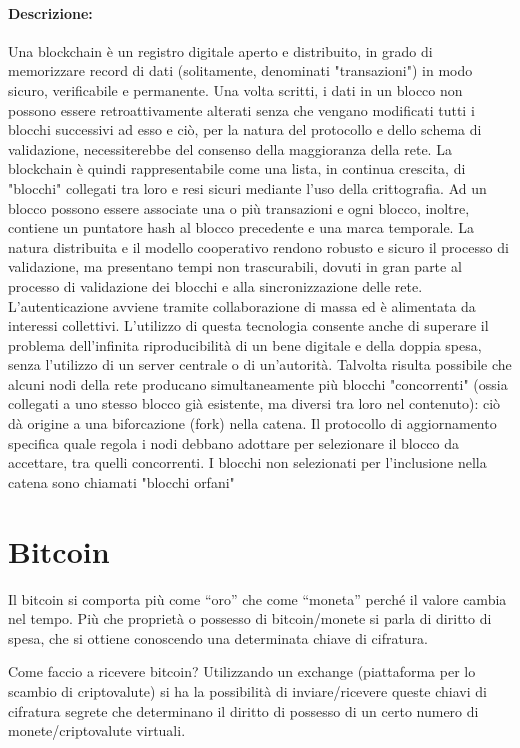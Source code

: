 \paragraph{Descrizione:} Una blockchain è un registro digitale aperto e distribuito, in grado di memorizzare record di dati (solitamente, denominati "transazioni") in modo sicuro, verificabile e permanente. Una volta scritti, i dati in un blocco non possono essere retroattivamente alterati senza che vengano modificati tutti i blocchi successivi ad esso e ciò, per
la natura del protocollo e dello schema di validazione, necessiterebbe del consenso della maggioranza della
rete. La blockchain è quindi rappresentabile come una lista, in continua crescita, di "blocchi" collegati tra loro e
resi sicuri mediante l'uso della crittografia. Ad un blocco possono essere associate una o più transazioni e ogni
blocco, inoltre, contiene un puntatore hash al blocco precedente e una marca temporale.
La natura distribuita e il modello cooperativo rendono robusto e sicuro il processo di validazione, ma presentano
tempi non trascurabili, dovuti in gran parte al processo di validazione dei blocchi e alla sincronizzazione delle
rete. L'autenticazione avviene tramite collaborazione di massa ed è alimentata da interessi collettivi. L'utilizzo di
questa tecnologia consente anche di superare il problema dell'infinita riproducibilità di un bene digitale e
della doppia spesa, senza l'utilizzo di un server centrale o di un'autorità.
Talvolta risulta possibile che alcuni nodi della rete producano simultaneamente più blocchi "concorrenti" (ossia
collegati a uno stesso blocco già esistente, ma diversi tra loro nel contenuto): ciò dà origine a una biforcazione
(fork) nella catena. Il protocollo di aggiornamento specifica quale regola i nodi debbano adottare per selezionare
il blocco da accettare, tra quelli concorrenti. I blocchi non selezionati per l'inclusione nella catena sono chiamati
"blocchi orfani"

\section{Bitcoin}
Il bitcoin si comporta più come “oro” che come “moneta” perché il valore cambia nel tempo. Più che proprietà o
possesso di bitcoin/monete si parla di diritto di spesa, che si ottiene conoscendo una determinata chiave di
cifratura.

\singlespacing

Come faccio a ricevere bitcoin? Utilizzando un exchange (piattaforma per lo scambio di criptovalute) si ha la
possibilità di inviare/ricevere queste chiavi di cifratura segrete che determinano il diritto di possesso di un certo
numero di monete/criptovalute virtuali.

